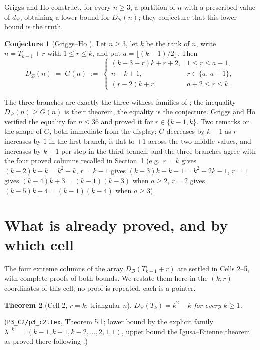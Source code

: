 \documentclass[11pt]{article}
\newtheorem{theorem}{Theorem}[section]
\theoremstyle{definition}
\newtheorem{conjecture}[theorem]{Conjecture}
\newcommand{\dB}{d_{\mathcal{B}}}
\newcommand{\DB}{D_{\mathcal{B}}}
\renewcommand{\le}{\leqslant}
\renewcommand{\ge}{\geqslant}
\begin{document}
Griggs and Ho \cite[Thm.~4.5]{GH98} construct, for every $n\ge3$, a partition of $n$ with a prescribed value of
$\dB$, obtaining a lower bound for $\DB(n)$; they conjecture that this lower bound is the truth.

\begin{conjecture}[Griggs--Ho {\cite[Conj.~4.7]{GH98}}]\label{conj:gh47}
Let $n\ge3$, let $k$ be the rank of $n$, write $n=T_{k-1}+r$ with $1\le r\le k$, and put $a=\lfloor(k-1)/2\rfloor$.
Then
\[
\DB(n)\;=\;G(n)\;:=\;
\begin{cases}
(k-3-r)k+r+2, & 1\le r\le a-1,\\[2pt]
n-k+1, & r\in\{a,\,a+1\},\\[2pt]
(r-2)k+r, & a+2\le r\le k.
\end{cases}
\]
\end{conjecture}

The three branches are exactly the three witness families of \cite[Thm.~4.5]{GH98}; the inequality $\DB(n)\ge G(n)$
is their theorem, the equality is the conjecture.  Griggs and Ho verified the equality for $n\le36$ and proved it
for $r\in\{k-1,k\}$.  Two remarks on the shape of $G$, both immediate from the display:
$G$ decreases by $k-1$ as $r$ increases by $1$ in the first branch, is flat-to-$+1$ across the two middle values,
and increases by $k+1$ per step in the third branch; and the three branches agree with the four proved columns
recalled in Section~\ref{sec:proved} (e.g.\ $r=k$ gives $(k-2)k+k=k^2-k$, $r=k-1$ gives $(k-3)k+k-1=k^2-2k-1$,
$r=1$ gives $(k-4)k+3=(k-1)(k-3)$ when $a\ge2$, $r=2$ gives $(k-5)k+4=(k-1)(k-4)$ when $a\ge3$).

\section{What is already proved, and by which cell}\label{sec:proved}

The four extreme columns of the array $\DB(T_{k-1}+r)$ are settled in Cells 2--5, with complete proofs of both
bounds.  We restate them here in the $(k,r)$ coordinates of this cell; no proof is repeated, each is a pointer.

\begin{theorem}[Cell 2, $r=k$: triangular $n$]\label{thm:c2}
$\DB(T_k)=k^2-k$ for every $k\ge1$.
\end{theorem}
\noindent(\texttt{P3\_C2/p3\_c2.tex}, Theorem 5.1; lower bound by the explicit family
$\lambda^{[k]}=(k-1,k-1,k-2,\dots,2,1,1)$, upper bound the Igusa--Etienne theorem as proved there following
\cite[Thm.~3.7]{GH98}.)
\end{document}
